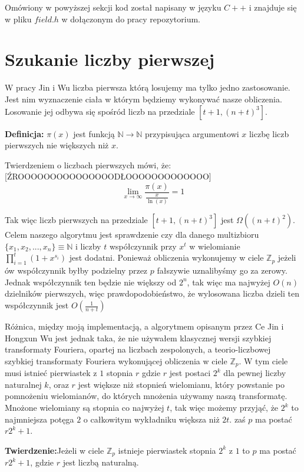 \documentclass{article}
\begin{document}
Omówiony w powyższej sekcji kod został napisany w języku $C++$ i znajduje się w 
pliku $field.h$ w dołączonym do pracy repozytorium.


\section{Szukanie liczby pierwszej}
W pracy Jin i Wu liczba pierwsza którą losujemy ma tylko jedno zastosowanie. Jest nim
wyznaczenie ciała w którym będziemy wykonywać nasze obliczenia. Losowanie jej odbywa się 
spośród liczb na przedziale $[t+1,(n+t)^3]$. 

\begin{tcolorbox}
        \textbf{Definicja:} $\pi(x)$ jest funkcją $\mathbb{N}\to\mathbb{N}$ przypisująca argumentowi $x$ liczbę 
        liczb pierwszych nie większych niż $x$.
\end{tcolorbox}

Twierdzeniem o liczbach pierwszych mówi, że: [ŹROOOOOOOOOOOOOOODŁOOOOOOOOOOOOO] 
$$\lim_{x \to \infty} \frac{\pi(x)}{\frac{x}{\ln(x)}}=1$$

Tak więc liczb pierwszych na przedziale $[t+1,(n+t)^3]$ jest $\Omega((n+t)^2)$. Celem naszego algorytmu jest sprawdzenie
czy dla danego multizbioru $\{x_1,x_2,...,x_n\} \equiv \mathbb{N}$ i liczby $t$ współczynnik przy $x^t$ w wielomianie 
$\prod_{i=1}^{t}(1+x^{s_i})$ jest dodatni. Ponieważ obliczenia wykonujemy w ciele $\mathbb{Z}_p$ jeżeli 
ów współczynnik byłby podzielny przez $p$ fałszywie uznalibyśmy go za zerowy. Jednak współczynnik ten będzie 
nie większy od $2^n$, tak więc ma najwyżej $O(n)$ dzielników pierwszych, więc prawdopodobieństwo, że wylosowana
liczba dzieli ten współczynnik jest $O(\frac{1}{n+t})$

Różnica, między moją implementacją, a algorytmem opisanym przez Ce Jin i Hongxun Wu jest 
jednak taka, że nie używałem klasycznej wersji szybkiej transformaty Fouriera, opartej na
liczbach zespolonych, a teorio-liczbowej szybkiej transformaty Fouriera wykonującej obliczenia
w ciele $\mathbb{Z}_p$. W tym ciele musi istnieć pierwiastek z $1$ stopnia $r$ gdzie
$r$ jest postaci $2^k$ dla pewnej liczby naturalnej $k$, oraz $r$ jest większe niż 
stopnień wielomianu, który powstanie po pomnożeniu wielomianów, do których mnożenia używamy naszą 
transformatę. Mnożone wielomiany są stopnia co najwyżej $t$, tak więc
możemy przyjąć, że $2^k$ to najmniejsza potęga $2$ o całkowitym wykładniku większa niż 
$2t$. zaś $p$ ma postać $r2^k+1$. 
\begin{tcolorbox}
    \textbf{Twierdzenie:}Jeżeli w ciele $\mathbb{Z}_p$ istnieje pierwiastek stopnia $2^k$ z $1$ to $p$ ma postać $r2^k+1$, gdzie $r$ jest liczbą naturalną.
\end{tcolorbox}
\end{document}
